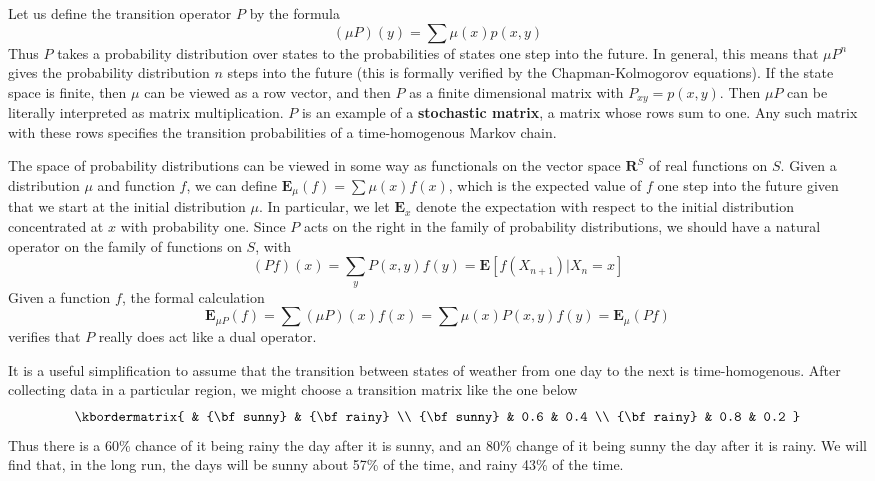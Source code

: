 Let us define the transition operator $P$ by the formula
%
\[ (\mu P)(y) = \sum \mu(x) p(x,y) \]
%
Thus $P$ takes a probability distribution over states to the probabilities of states one step into the future. In general, this means that $\mu P^n$ gives the probability distribution $n$ steps into the future (this is formally verified by the Chapman-Kolmogorov equations). If the state space is finite, then $\mu$ can be viewed as a row vector, and then $P$ as a finite dimensional matrix with $P_{xy} = p(x,y)$. Then $\mu P$ can be literally interpreted as matrix multiplication. $P$ is an example of a {\bf stochastic matrix}, a matrix whose rows sum to one. Any such matrix with these rows specifies the transition probabilities of a time-homogenous Markov chain.

The space of probability distributions can be viewed in some way as functionals on the vector space $\mathbf{R}^S$ of real functions on $S$. Given a distribution $\mu$ and function $f$, we can define $\mathbf{E}_\mu(f) = \sum \mu(x)f(x)$, which is the expected value of $f$ one step into the future given that we start at the initial distribution $\mu$. In particular, we let $\mathbf{E}_x$ denote the expectation with respect to the initial distribution concentrated at $x$ with probability one. Since $P$ acts on the right in the family of probability distributions, we should have a natural operator on the family of functions on $S$, with
%
\[ (Pf)(x) = \sum_y P(x,y) f(y) = \mathbf{E}[f(X_{n+1})|X_n = x] \]
%
Given a function $f$, the formal calculation
%
\[ \mathbf{E}_{\mu P}(f) = \sum (\mu P)(x) f(x) = \sum \mu(x) P(x,y) f(y) = \mathbf{E}_\mu(Pf) \]
%
verifies that $P$ really does act like a dual operator.

\begin{example}
    It is a useful simplification to assume that the transition between states of weather from one day to the next is time-homogenous. After collecting data in a particular region, we might choose a transition matrix like the one below
    \[
  \kbordermatrix{
    & {\bf sunny} & {\bf rainy} \\
    {\bf sunny} & 0.6 & 0.4 \\
    {\bf rainy} & 0.8 & 0.2
  }
\]
    Thus there is a 60\% chance of it being rainy the day after it is sunny, and an 80\% change of it being sunny the day after it is rainy. We will find that, in the long run, the days will be sunny about 57\% of the time, and rainy 43\% of the time.
\end{example}

